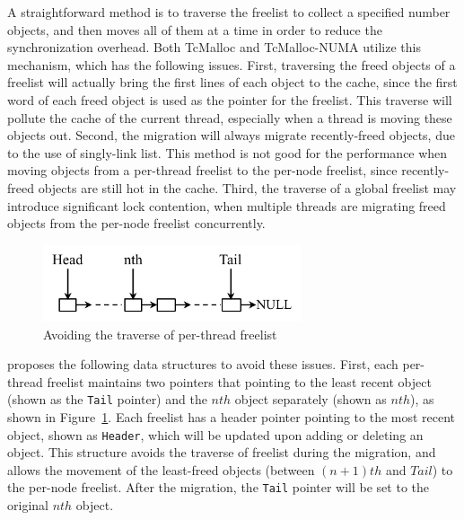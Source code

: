 
A straightforward method is to traverse the freelist to collect a specified number objects, and then moves all of them at a time in order to reduce the synchronization overhead. Both TcMalloc and TcMalloc-NUMA utilize this mechanism, which has the following issues. First, traversing the freed objects of a freelist will actually bring the first lines of each object to the cache, since the first word of each freed object is used as the pointer for the freelist. This traverse will pollute the cache of the current thread, especially when a thread is moving these objects out. 
Second, the migration will always migrate recently-freed objects, due to the use of singly-link list. This method is not good for the performance when moving objects from a per-thread freelist to the per-node freelist, since recently-freed objects are still hot in the cache. 
Third, the traverse of a global freelist may introduce significant lock contention, when multiple threads are migrating freed objects from the per-node freelist concurrently.

\begin{figure}[!h]
\centering
\includegraphics[width=3in]{figure/perthreadlist}
\vspace{-0.1in}
\caption{Avoiding the traverse of per-thread freelist\label{fig:perthreadlist}}
\vspace{-0.1in}
\end{figure}

\NM{} proposes the following data structures to avoid these issues. First, each per-thread freelist maintains two pointers that pointing to the least recent object (shown as the \texttt{Tail} pointer) and the $nth$ object separately (shown as $nth$), as shown in Figure~\ref{fig:perthreadlist}. Each freelist has a header pointer pointing to the most recent object, shown as \texttt{Header}, which will be updated upon adding or deleting an object. This structure avoids the traverse of freelist during the migration, and allows the movement of the least-freed objects (between $(n+1)th$ and $Tail$) to the per-node freelist. After the migration, the \texttt{Tail} pointer will be set to the original $nth$ object. 


